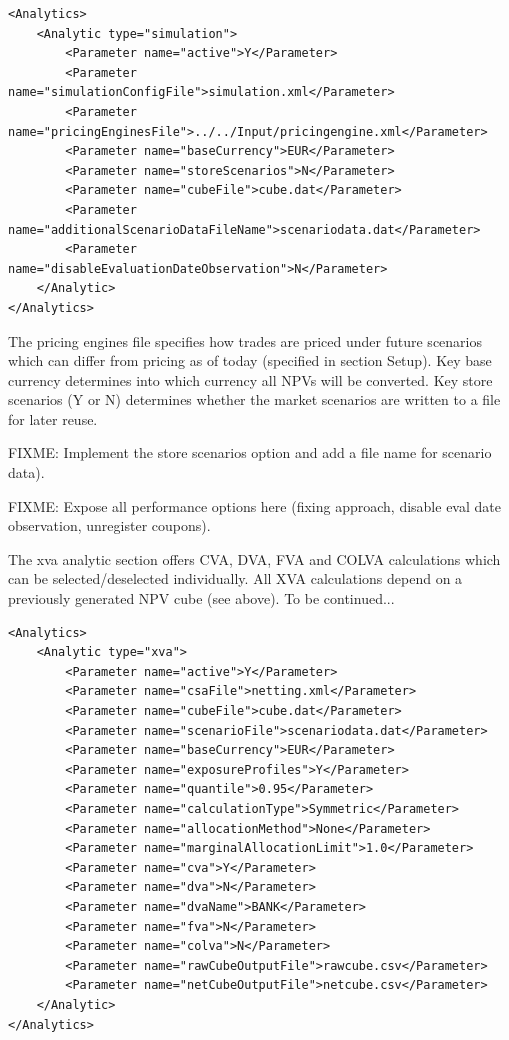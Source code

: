 \documentclass[12pt, a4paper]{article}
\begin{document}
{\footnotesize
\begin{lstlisting}[caption={ORE analytic: simulation},
 	label=lst:ore_simulation]
<Analytics>
	<Analytic type="simulation">
		<Parameter name="active">Y</Parameter>
		<Parameter name="simulationConfigFile">simulation.xml</Parameter>
		<Parameter name="pricingEnginesFile">../../Input/pricingengine.xml</Parameter>
		<Parameter name="baseCurrency">EUR</Parameter>
		<Parameter name="storeScenarios">N</Parameter>
		<Parameter name="cubeFile">cube.dat</Parameter>
		<Parameter name="additionalScenarioDataFileName">scenariodata.dat</Parameter>
		<Parameter name="disableEvaluationDateObservation">N</Parameter>
	</Analytic>
</Analytics>      
\end{lstlisting}
}

The pricing engines file specifies how trades are priced under future scenarios which can differ from pricing as of today (specified in section Setup).
Key base currency determines into which currency all NPVs will be converted. Key store scenarios (Y or N) determines whether the market scenarios are written to a file for later reuse.

{\color{red}FIXME: Implement the store scenarios option and add a file name for scenario data}). 

{\color{red}FIXME: Expose all performance options here (fixing approach, disable eval date observation, unregister coupons)}. 

\medskip
The xva analytic section offers CVA, DVA, FVA and COLVA calculations which can be selected/deselected individually. All XVA calculations depend on a previously generated NPV cube (see above). To be continued... 

{\footnotesize
\begin{lstlisting}[caption={ORE analytic: xva},
 	label=lst:ore_xva]
<Analytics>
	<Analytic type="xva">
		<Parameter name="active">Y</Parameter>
		<Parameter name="csaFile">netting.xml</Parameter>
		<Parameter name="cubeFile">cube.dat</Parameter>
		<Parameter name="scenarioFile">scenariodata.dat</Parameter>
		<Parameter name="baseCurrency">EUR</Parameter>
		<Parameter name="exposureProfiles">Y</Parameter>
		<Parameter name="quantile">0.95</Parameter>
		<Parameter name="calculationType">Symmetric</Parameter>      
		<Parameter name="allocationMethod">None</Parameter>    
		<Parameter name="marginalAllocationLimit">1.0</Parameter>    
		<Parameter name="cva">Y</Parameter>
		<Parameter name="dva">N</Parameter>
		<Parameter name="dvaName">BANK</Parameter>
		<Parameter name="fva">N</Parameter>
		<Parameter name="colva">N</Parameter>
		<Parameter name="rawCubeOutputFile">rawcube.csv</Parameter>
		<Parameter name="netCubeOutputFile">netcube.csv</Parameter>     
	</Analytic>
</Analytics>
\end{lstlisting}
}
\end{document}
